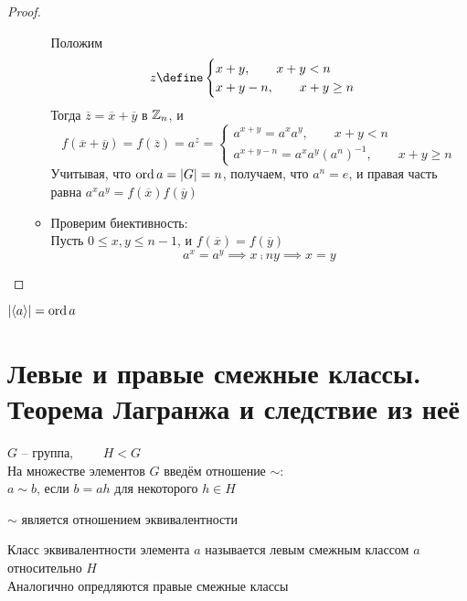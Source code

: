 \begin{proof}
\begin{itemize}
\begin{itemize}
			Положим
			$$ z \define
			\begin{cases}
				x + y, \qquad x + y < n \\
				x + y - n, \qquad x + y \ge n
			\end{cases} $$
			Тогда $ \overline{z} = \overline{x} + \overline{y} $ в $ \mathbb{Z}_n $, и
			$$ f(\overline{x} + \overline{y}) = f(\overline{z}) = a^z =
			\begin{cases}
				a^{x + y} = a^xa^y, \qquad x + y < n \\
				a^{x + y - n} = a^xa^y(a^n)^{-1}, \qquad x + y \ge n
			\end{cases} $$
			Учитывая, что $ \operatorname{ord} a = |G| = n $, получаем, что $ a^n = e $, и правая часть равна $ a^xa^y = f(\overline{x})f(\overline{y}) $
			\item Проверим биективность: \\
			Пусть $ 0 \le x, y \le n - 1 $, и $ f(\overline{x}) = f(\overline{y}) $
			$$ a^x = a^y \implies x \comp{n} y \implies x = y $$
		\end{itemize}
	\end{itemize}
\end{proof}

\begin{property}
	$ |\langle a \rangle| = \operatorname{ord} a $
\end{property}

\section{Левые и правые смежные классы. Теорема Лагранжа и следствие из неё}

\begin{notation}
	$ G $ -- группа, $ \qquad H < G $ \\
	На множестве элементов $ G $ введём отношение $ \sim $: \\
	$ a \sim b $, если $ b = ah $ для некоторого $ h \in H $
\end{notation}

\begin{property}
	$ \sim $ является отношением эквивалентности
\end{property}

\begin{definition}
	Класс эквивалентности элемента $ a $ называется левым смежным классом $ a $ относительно $ H $ \\
	Аналогично опредляются правые смежные классы
\end{definition}


